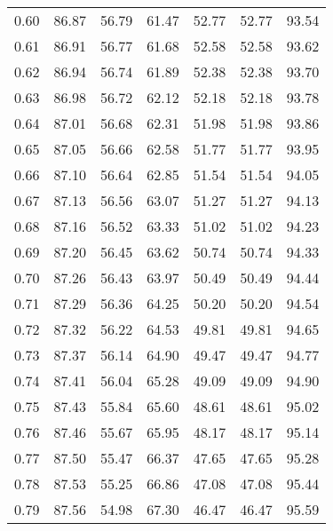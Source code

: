 \begin{tabular}{|c|c|c|c|c|c|c|}
      0.60 &     86.87 &     56.79 &      61.47 &   52.77 &      52.77 &         93.54 \\
      0.61 &     86.91 &     56.77 &      61.68 &   52.58 &      52.58 &         93.62 \\
      0.62 &     86.94 &     56.74 &      61.89 &   52.38 &      52.38 &         93.70 \\
      0.63 &     86.98 &     56.72 &      62.12 &   52.18 &      52.18 &         93.78 \\
      0.64 &     87.01 &     56.68 &      62.31 &   51.98 &      51.98 &         93.86 \\
      0.65 &     87.05 &     56.66 &      62.58 &   51.77 &      51.77 &         93.95 \\
      0.66 &     87.10 &     56.64 &      62.85 &   51.54 &      51.54 &         94.05 \\
      0.67 &     87.13 &     56.56 &      63.07 &   51.27 &      51.27 &         94.13 \\
      0.68 &     87.16 &     56.52 &      63.33 &   51.02 &      51.02 &         94.23 \\
      0.69 &     87.20 &     56.45 &      63.62 &   50.74 &      50.74 &         94.33 \\
      0.70 &     87.26 &     56.43 &      63.97 &   50.49 &      50.49 &         94.44 \\
      0.71 &     87.29 &     56.36 &      64.25 &   50.20 &      50.20 &         94.54 \\
      0.72 &     87.32 &     56.22 &      64.53 &   49.81 &      49.81 &         94.65 \\
      0.73 &     87.37 &     56.14 &      64.90 &   49.47 &      49.47 &         94.77 \\
      0.74 &     87.41 &     56.04 &      65.28 &   49.09 &      49.09 &         94.90 \\
      0.75 &     87.43 &     55.84 &      65.60 &   48.61 &      48.61 &         95.02 \\
      0.76 &     87.46 &     55.67 &      65.95 &   48.17 &      48.17 &         95.14 \\
      0.77 &     87.50 &     55.47 &      66.37 &   47.65 &      47.65 &         95.28 \\
      0.78 &     87.53 &     55.25 &      66.86 &   47.08 &      47.08 &         95.44 \\
      0.79 &     87.56 &     54.98 &      67.30 &   46.47 &      46.47 &         95.59 \\

\end{tabular}
